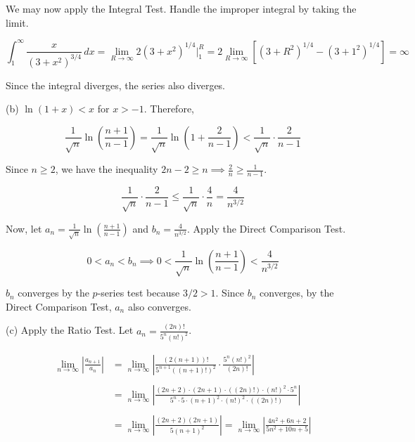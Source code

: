 \documentclass{article}
\begin{document}
\hfill

\noindent We may now apply the Integral Test. Handle the improper integral by taking the limit.

\[\int_1^\infty\frac x{\left(3+x^2\right)^{3/4}}\,dx=\lim_{R\to\infty}2\left(3+x^2\right)^{1/4}\bigg|_1^R=2\lim_{R\to\infty}\left[(3+R^2)^{1/4}-\left(3+1^2\right)^{1/4}\right]=\infty\]

\hfill

\noindent Since the integral diverges, the series also diverges.

\hfill

\noindent (b) $\ln(1+x)<x$ for $x>-1$. Therefore,

\[\frac1{\sqrt n}\ln\left(\frac{n+1}{n-1}\right)=\frac1{\sqrt n}\ln\left(1+\frac2{n-1}\right)<\frac1{\sqrt n}\cdot\frac2{n-1}\]

\hfill

\noindent Since $n\geq2$, we have the inequality $\displaystyle 2n-2\geq n\implies\frac2n\geq\frac1{n-1}$.

\hfill

\[\frac1{\sqrt n}\cdot\frac2{n-1}\leq\frac1{\sqrt n}\cdot\frac4n=\frac4{n^{3/2}}\]

\hfill

\noindent Now, let $\displaystyle a_n=\frac1{\sqrt n}\ln\left(\frac{n+1}{n-1}\right)$ and $\displaystyle b_n=\frac4{n^{3/2}}$. Apply the Direct Comparison Test.

\[0<a_n<b_n\implies0<\frac1{\sqrt n}\ln\left(\frac{n+1}{n-1}\right)<\frac4{n^{3/2}}\]

\hfill

\noindent $b_n$ converges by the $p$-series test because $3/2>1$. Since $b_n$ converges, by the Direct Comparison Test, $a_n$ also converges.

\noindent (c) Apply the Ratio Test. Let $\displaystyle a_n=\frac{(2n)!}{5^n\left(n!\right)^2}$.

\begin{align*}\lim_{n\to\infty}\left|\frac{a_{n+1}}{a_n}\right|&=\lim_{n\to\infty}\left|\frac{(2(n+1))!}{5^{n+1}\left((n+1)!\right)^2}\cdot\frac{5^n\left(n!\right)^2}{(2n)!}\right|\\\\&=\lim_{n\to\infty}\left|\frac{(2n+2)\cdot(2n+1)\cdot((2n)!)\cdot(n!)^2\cdot5^n}{5^n\cdot5\cdot(n+1)^2\cdot(n!)^2\cdot((2n)!)}\right|\\\\&=\lim_{n\to\infty}\left|\frac{(2n+2)(2n+1)}{5(n+1)^2}\right|=\lim_{n\to\infty}\left|\frac{4n^2+6n+2}{5n^2+10n+5}\right|\end{align*}
\end{document}
